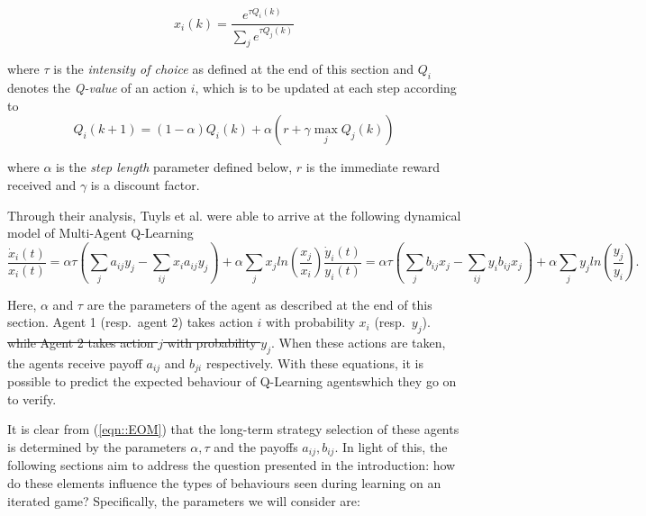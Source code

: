 \documentclass[sigconf,anonymous]{aamas}
\begin{document}
\begin{equation}
    x_i(k) = \frac{e^{\tau Q_i(k)}}{\sum_j e^{\tau Q_j(k)}}
\end{equation}

where $\tau$ is the \textit{intensity of choice} as defined at the end of this section and $Q_i$ denotes the \textit{Q-value} of an action $i$, which is to be updated at each step according to
%
\begin{equation}
\label{eqn::Qupdate}
    Q_i(k+1) = (1 - \alpha) Q_i(k) + \alpha (r + \gamma \max_j Q_j(k))
\end{equation}

where $\alpha$ is the \textit{step length} parameter defined below, $r$ is the immediate reward received and $\gamma$ is a discount factor.

Through their analysis, Tuyls et al. were able to
arrive at the following dynamical model of Multi-Agent Q-Learning
%
\begin{subequations}
\label{eqn::EOM}
    \begin{equation}
        \frac{\dot{x}_i(t)}{x_i(t)} = \alpha \tau (\sum_{j} a_{ij} y_j - \sum_{i j} x_i a_{ij} y_j)
        + \alpha \sum_j x_j ln(\frac{x_j}{x_i}) 
    \end{equation}
    \begin{equation}
        \frac{\dot{y}_i(t)}{y_i(t)} = \alpha \tau (\sum_{j} b_{ij} x_j - \sum_{i j} y_i b_{ij} x_j)
        + \alpha \sum_j y_j ln(\frac{y_j}{y_i}).
    \end{equation}
\end{subequations}

Here, $\alpha$ and $\tau$ are the parameters of the agent as described at the end of this section. Agent 1 (resp.~agent 2) takes action $i$ with probability
$x_i$ (resp.~$y_j$).
\st{while Agent 2 takes action $j$ with probability $y_j$}. When these actions are taken, the agents
receive payoff $a_{ij}$ and $b_{ji}$ respectively. With these equations, it is possible to
predict the expected behaviour of Q-Learning agentswhich they go on to verify.

It is clear from (\ref{eqn::EOM}) that the long-term strategy selection of
these agents is determined by the parameters $\alpha, \tau$ and the payoffs $a_{ij}, b_{ij}$. In light of this, the following sections aim to address the question presented in the introduction: how do these elements influence the types of behaviours seen during
learning on an iterated game? Specifically, the parameters we will consider are:
\end{document}
